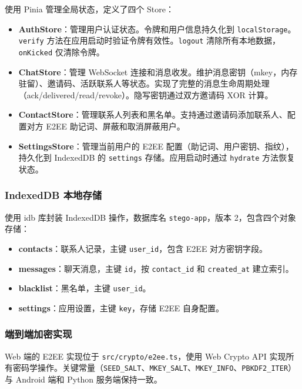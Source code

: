 使用 Pinia 管理全局状态，定义了四个 Store：

\begin{itemize}
    \item \textbf{AuthStore}：管理用户认证状态。令牌和用户信息持久化到 \texttt{localStorage}。\texttt{verify} 方法在应用启动时验证令牌有效性。\texttt{logout} 清除所有本地数据，\texttt{onKicked} 仅清除令牌。
    \item \textbf{ChatStore}：管理 WebSocket 连接和消息收发。维护消息密钥（mkey，内存驻留）、邀请码、活跃联系人等状态。实现了完整的消息生命周期处理（ack/delivered/read/revoke）。隐写密钥通过双方邀请码 XOR 计算。
    \item \textbf{ContactStore}：管理联系人列表和黑名单。支持通过邀请码添加联系人、配置对方 E2EE 助记词、屏蔽和取消屏蔽用户。
    \item \textbf{SettingsStore}：管理当前用户的 E2EE 配置（助记词、用户密钥、指纹），持久化到 IndexedDB 的 \texttt{settings} 存储。应用启动时通过 \texttt{hydrate} 方法恢复状态。
\end{itemize}

\subsubsection{IndexedDB 本地存储}

使用 idb 库封装 IndexedDB 操作，数据库名 \texttt{stego-app}，版本 2，包含四个对象存储：

\begin{itemize}
    \item \textbf{contacts}：联系人记录，主键 \texttt{user\_id}，包含 E2EE 对方密钥字段。
    \item \textbf{messages}：聊天消息，主键 \texttt{id}，按 \texttt{contact\_id} 和 \texttt{created\_at} 建立索引。
    \item \textbf{blacklist}：黑名单，主键 \texttt{user\_id}。
    \item \textbf{settings}：应用设置，主键 \texttt{key}，存储 E2EE 自身配置。
\end{itemize}

\subsubsection{端到端加密实现}

Web 端的 E2EE 实现位于 \texttt{src/crypto/e2ee.ts}，使用 Web Crypto API 实现所有密码学操作。关键常量（\texttt{SEED\_SALT}、\texttt{MKEY\_SALT}、\texttt{MKEY\_INFO}、\texttt{PBKDF2\_ITER}）与 Android 端和 Python 服务端保持一致。

